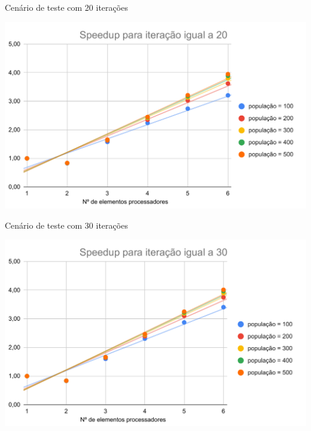 
\begin{graph}[h]{16cm}
    \caption{Cenário de teste com 20 iterações}
        \includegraphics[width=14cm]{graficos/Speedup para iteração igual a 20.pdf}
\end{graph}

\begin{graph}[h]{16cm}
    \caption{Cenário de teste com 30 iterações}
        \includegraphics[width=14cm]{graficos/Speedup para iteração igual a 30.pdf}
\end{graph}

